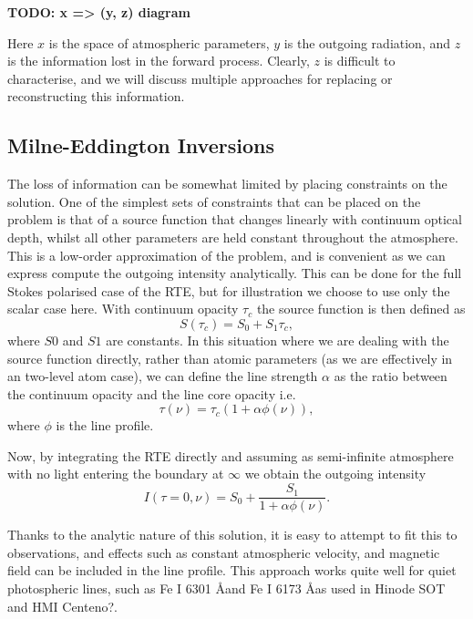 \textbf{TODO: x => (y, z) diagram}

Here $x$ is the space of atmospheric parameters, $y$ is the outgoing radiation, and $z$ is the information lost in the forward process. Clearly, $z$ is difficult to characterise, and we will discuss multiple approaches for replacing or reconstructing this information.

\subsection{Milne-Eddington Inversions}

The loss of information can be somewhat limited by placing constraints on the solution. One of the simplest sets of constraints that can be placed on the problem is that of a source function that changes linearly with continuum optical depth, whilst all other parameters are held constant throughout the atmosphere.
This is a low-order approximation of the problem, and is convenient as we can express compute the outgoing intensity analytically.
This can be done for the full Stokes polarised case of the RTE, but for illustration we choose to use only the scalar case here.
With continuum opacity $\tau_c$ the source function is then defined as
\begin{equation}
    S(\tau_c) = S_0 + S_1 \tau_c,
\end{equation}
where $S0$ and $S1$ are constants.
In this situation where we are dealing with the source function directly, rather than atomic parameters (as we are effectively in an two-level atom case), we can define the line strength $\alpha$ as the ratio between the continuum opacity and the line core opacity i.e.
\begin{equation}
    \tau(\nu) = \tau_c (1 + \alpha \phi(\nu)),
\end{equation}
where $\phi$ is the line profile.

Now, by integrating the RTE directly and assuming as semi-infinite atmosphere with no light entering the boundary at $\infty$ we obtain the outgoing intensity
\begin{equation}
I(\tau=0, \nu) = S_0 + \frac{S_1}{1 + \alpha\phi(\nu)}.
\end{equation}

Thanks to the analytic nature of this solution, it is easy to attempt to fit this to observations, and effects such as constant atmospheric velocity, and magnetic field can be included in the line profile.
This approach works quite well for quiet photospheric lines, such as Fe I 6301 \AA and Fe I 6173 \AA as used in Hinode SOT and HMI \NeedRef{} Centeno?.

